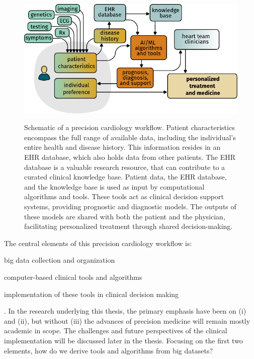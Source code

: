 \begin{figure}[bth]
    \vspace{1em}
    \caption[Perspectives of precision medicine]{%
    Schematic of a precision cardiology workflow.
    Patient characteristics encompass the full range of available data,
    including the individual's entire health and disease history.
    This information resides in an \ac{EHR} database, 
    which also holds data from other patients. 
    The \ac{EHR} database is a valuable research resource, 
    that can contribute to a curated clinical knowledge base. 
    Patient data, the \ac{EHR} database, 
    and the knowledge base is used as input 
    by computational algorithms and tools. 
    These tools act as clinical decision support systems, 
    providing prognostic and diagnostic models. 
    The outputs of these models 
    are shared with both the patient and the physician, 
    facilitating personalized treatment 
    through shared decision-making.%
    }
	\includegraphics{graphics/precision-cardiology}
    \label{fig:precision-cardiology}
    \vspace{-3em}
\end{figure}

The central elements of this precision cardiology workflow is:
\begin{enumerate*}
    \item big data collection and organization
    \item computer-based clinical tools and algorithms
    \item implementation of these tools in clinical decision making
\end{enumerate*}.
In the research underlying this thesis, 
the primary emphasis have been on (i) and (ii),
but without (iii) the advances of precision medicine
will remain mostly academic in scope.
The challenges and future perspectives of the clinical implementation
will be discussed later in the thesis.
Focusing on the first two elements, 
how do we derive tools and algorithms from big datasets?

